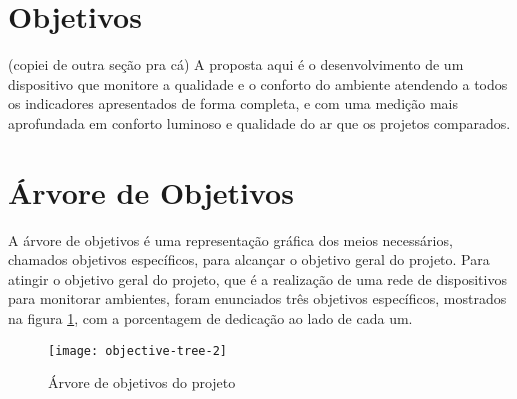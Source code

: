 \documentclass[../monografia.tex]{subfiles}
\begin{document}
\section{Objetivos}
(copiei de outra seção pra cá) A proposta aqui é o desenvolvimento de um dispositivo que monitore a qualidade e o conforto do ambiente atendendo a todos os indicadores apresentados de forma completa, e com uma medição mais aprofundada em conforto luminoso e qualidade do ar que os projetos comparados. 

\section{Árvore de Objetivos} 
A árvore de objetivos é uma representação gráfica dos meios necessários, chamados objetivos específicos, para alcançar o objetivo geral do projeto. Para atingir o objetivo geral do projeto, que é a realização de uma rede de dispositivos para monitorar ambientes, foram enunciados três objetivos específicos, mostrados na figura \ref{fig:objective-tree}, com a porcentagem de dedicação ao lado de cada um.

\begin{figure}[h!]
\texttt{[image: objective-tree-2]}
\centering
\caption{Árvore de objetivos do projeto}
\label{fig:objective-tree}
\end{figure}
\end{document}
